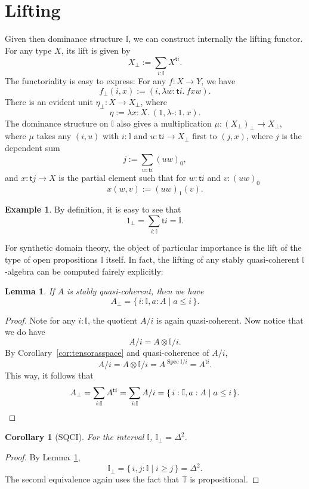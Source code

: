 \documentclass[12pt]{amsart}
\newtheorem{lemma}[theorem]{Lemma}
\newtheorem{corollary}[theorem]{Corollary}
\theoremstyle{definition}
\newtheorem{example}[theorem]{Example}
\newcommand{\mbb}[1]{\mathbb{#1}}
\newcommand{\T}{\mbb T}
\newcommand{\I}{\mbb I}
\newcommand{\ms}[1]{\mathsf{#1}}
\newcommand{\scomp}[2]{\{\,#1\mid#2\,\}}
\newcommand{\prt}{_{\bot}}
\newcommand{\ld}[2]{\lambda #1\!\colon\!\!#2.\ }
\newcommand{\hp}{\text{-}}
\newcommand{\spec}{\operatorname{Spec}}
\begin{document}
\section{Lifting}\label{sec:lifting}

Given then dominance structure $\I$, we can construct internally the lifting functor. For any type $X$, its lift is given by
\[ X\prt := \sum_{i:\I}X^{\ms ti}. \]
The functoriality is easy to express: For any $f : X \to Y$, we have
\[ f\prt(i,x) := (i,\ld{w}{\ms ti}fxw). \]
There is an evident unit $\eta\prt : X \to X\prt$, where
\[ \eta := \ld x X(1,\ld\hp 1 x). \]
The dominance structure on $\I$ also gives a multiplication $\mu : (X\prt)\prt \to X\prt$, where $\mu$ takes any $(i,u)$ with $i : \I$ and $u : \ms ti \to X\prt$ first to $(j,x)$, where $j$ is the dependent sum
\[ j := \sum_{w:\ms ti} (uw)_0, \]
and $x : \ms tj \to X$ is the partial element such that for $w : \ms ti$ and $v : (uw)_0$
\[ x(w,v) := (uw)_1(v). \]

\begin{example}
  By definition, it is easy to see that
  \[ 1\prt = \sum_{i:\I}\ms ti = \I. \]
\end{example}

For synthetic domain theory, the object of particular importance is the lift of the type of open propositions $\I$ itself. In fact, the lifting of any stably quasi-coherent $\I$-algebra can be computed fairely explicitly:

\begin{lemma}\label{lem:liftingofalgebra}
  If $A$ is stably quasi-coherent, then we have
  \[ A\prt = \scomp{i : \I, a : A}{a \le i}. \]
\end{lemma}
\begin{proof}
  Note for any $i : \I$, the quotient $A/i$ is again quasi-coherent. Now notice that we do have
  \[ A/i = A \otimes \I/i. \]
  By Corollary~\ref{cor:tensorasspace} and quasi-coherence of $A/i$, 
  \[ A/i = A \otimes \I/i = A^{\spec \I/i} = A^{\ms ti}. \]
  This way, it follows that 
  \[ A\prt = \sum_{i:\I}A^{\ms ti} = \sum_{i:\I}A/i = \scomp{i : \I, a : A}{a \le i}. \qedhere \]
\end{proof}

\begin{corollary}[SQCI]
  For the interval $\I$, $\I\prt = \Delta^2$.
\end{corollary}
\begin{proof}
  By Lemma~\ref{lem:liftingofalgebra}, 
  \[ \I\prt = \scomp{i,j : \I}{i \ge j} = \Delta^2. \]
  The second equivalence again uses the fact that $\T$ is propositional.
\end{proof}
\end{document}
